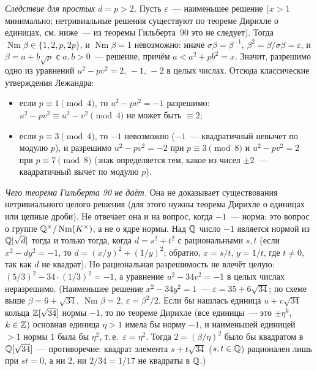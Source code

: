 \begin{example}
\emph{Следствие для простых $d=p>2$.} Пусть $\varepsilon$~--- наименьшее решение ($x>1$ минимально; нетривиальные
решения существуют по теореме Дирихле о единицах, см. ниже~--- из теоремы Гильберта~90 это не следует). Тогда
$\operatorname{Nm}\beta\in\{1,2,p,2p\}$, и $\operatorname{Nm}\beta=1$ невозможно: иначе $\sigma\beta=\beta^{-1}$, $\beta^2=\beta/\sigma\beta=\varepsilon$, и
$\beta=a+b\sqrt p$ с $a,b>0$~--- решение, причём $a<a^2+pb^2=x$. Значит, разрешимо одно из уравнений $u^2-pv^2=2,\,-1,\,-2$ в целых
числах. Отсюда классические утверждения Лежандра:
\begin{itemize}[leftmargin=*]
\item если $p\equiv1\pmod4$, то $u^2-pv^2=-1$ разрешимо: $u^2-pv^2\equiv u^2-v^2\pmod4$ не может быть $\equiv2$;
\item если $p\equiv3\pmod4$, то $-1$ невозможно ($-1$~--- квадратичный невычет по модулю $p$), и разрешимо $u^2-pv^2=-2$ при
$p\equiv3\pmod8$ и $u^2-pv^2=2$ при $p\equiv7\pmod8$ (знак определяется тем, какое из чисел $\pm2$~--- квадратичный
вычет по модулю $p$).
\end{itemize}

\emph{Чего теорема Гильберта 90 не даёт.} Она не доказывает существования нетривиального целого решения (для этого нужны
теорема Дирихле о единицах или цепные дроби). Не отвечает она и на вопрос, когда $-1$~--- норма: это вопрос о группе
$\mathbb Q^\times/\operatorname{Nm}(K^\times)$, а не о ядре нормы. Над $\mathbb Q$ число $-1$ является нормой из $\mathbb Q[\sqrt d]$ тогда и
только тогда, когда $d=s^2+t^2$ с рациональными $s,t$ (если $x^2-dy^2=-1$, то $d=(x/y)^2+(1/y)^2$; обратно, $x=s/t$,
$y=1/t$, где $t\ne0$, так как $d$ не квадрат). Но рациональная разрешимость не влечёт целую: $(5/3)^2-34\cdot(1/3)^2=-1$,
а уравнение $u^2-34v^2=-1$ в целых числах неразрешимо. (Наименьшее решение $x^2-34y^2=1$~--- $\varepsilon=35+6\sqrt{34}$;
по схеме выше $\beta=6+\sqrt{34}$, $\operatorname{Nm}\beta=2$, $\varepsilon=\beta^2/2$. Если бы нашлась единица
$u+v\sqrt{34}$ кольца $\mathbb Z[\sqrt{34}]$ нормы $-1$, то по теореме Дирихле (все единицы~--- это $\pm\eta^k$, $k\in\mathbb Z$)
основная единица $\eta>1$ имела бы норму $-1$, и наименьшей единицей $>1$ нормы $1$ была бы $\eta^2$, т.\,е.\
$\varepsilon=\eta^2$. Тогда $2=(\beta/\eta)^2$ было бы квадратом в $\mathbb Q[\sqrt{34}]$~--- противоречие: квадрат элемента
$s+t\sqrt{34}$ ($s,t\in\mathbb Q$) рационален лишь при $st=0$, а ни $2$, ни $2/34=1/17$ не квадраты в $\mathbb Q$.)
\end{example}


